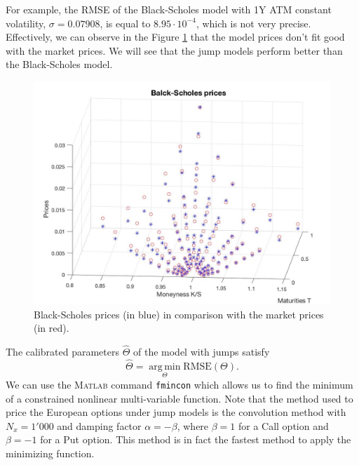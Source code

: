 For example, the RMSE of the Black-Scholes model with 1Y ATM constant volatility, $\sigma = 0.07908$, is equal to $8.95\cdot 10^{-4}$, which is not very precise. Effectively, we can observe in the Figure \ref{fig:calibration:BS} that the model prices don't fit good with the market prices. We will see that the jump models perform better than the Black-Scholes model. 
\begin{figure}[!htb]
\centering
	\includegraphics[scale = 0.3]{gfx/BS-prices}
	\caption{Black-Scholes prices (in blue) in comparison with the market prices (in red).}
	\label{fig:calibration:BS}
\end{figure}

The calibrated parameters $\hat{\Theta}$ of the model with jumps satisfy 
$$\hat{\Theta}=\operatorname*{arg\,min}_\Theta \text{RMSE}(\Theta).$$
We can use the \textsc{Matlab} command \texttt{fmincon} which allows us to find the minimum of a constrained nonlinear multi-variable function. Note that the method used to price the European options under jump models is the convolution method with $N_x = 1'000$ and damping factor $\alpha = -\beta$, where $\beta = 1$ for a Call option and $\beta = -1$ for a Put option. This method is in fact the fastest method to apply the minimizing function.


